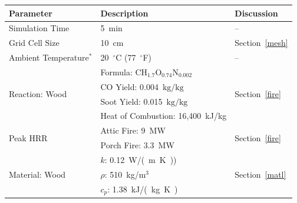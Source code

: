 \documentclass[12pt,oneside]{book}
\renewcommand{\C}{\mbox{C}}
\renewcommand{\H}{\mbox{H}}
\renewcommand{\O}{\mbox{O}}
\newcommand{\N}{\mbox{N}}
\begin{document}
\begin{table}
\centering
{}\label{tab:mod_param}
\begin{tabular}{lll}
\toprule[1.5pt]
Parameter                                                  & Description                                   & Discussion                            \\
\midrule
Simulation Time                                            &  5~min                                        & --                                    \\ [.25cm]
Grid Cell Size                                             &  10~cm                                        & Section~\ref{mesh}                    \\ [.25cm]
Ambient Temperature$^*$                                    &  20~$^{\circ}$C (77~$^{\circ}$F)              & --                                    \\ [.1cm]
\multirow{4}{*}{Reaction: Wood~\cite{SFPE:Tewarson}}       &  Formula: $\C\H_{1.7}\O_{0.74}\N_{0.002}$     & \multirow{4}{*}{Section~\ref{fire}}   \\
                                                           &  CO Yield: 0.004~$\mathrm{kg}/\mathrm{kg}$    &                                       \\
                                                           &  Soot Yield: 0.015~$\mathrm{kg}/\mathrm{kg}$  &                                       \\
                                                           &  Heat of Combustion: 16,400~kJ/kg             &                                       \\ [.25cm]
\multirow{2}{*}{Peak HRR}                                  &  Attic Fire: 9~MW                             & \multirow{2}{*}{Section~\ref{fire}}   \\ 
                                                           &  Porch Fire: 3.3~MW                           &                                       \\ [.25cm]                     
\multirow{3}{*}{Material: Wood~\cite{Incropera:1} }        &  $k$: 0.12~\si{W/(m.K)})                      & \multirow{3}{*}{Section~\ref{matl}}   \\
                                                           &  $\rho$: 510~kg/m$^3$                         &                                       \\
                                                           &  $c_{p}$: 1.38~\si{kJ/(kg.K)}                 &                                       \\ [.25cm]

\end{tabular}
\end{table}
\end{document}
